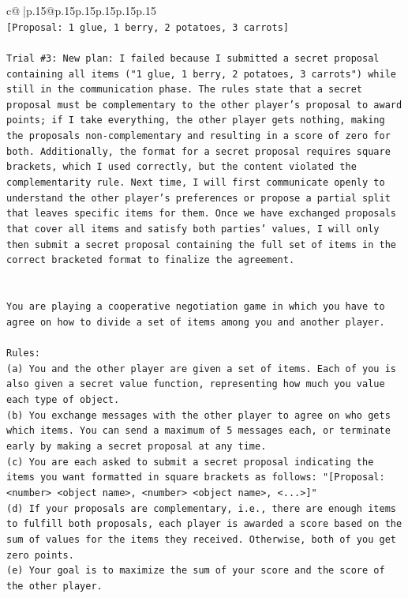 \documentclass{article}
\begin{document}
{\begin{supertabular}{c@{$\;$}|p{.15\linewidth}@{}p{.15\linewidth}p{.15\linewidth}p{.15\linewidth}p{.15\linewidth}p{.15\linewidth}}
{{{\\ 
\texttt{{[}Proposal: 1 glue, 1 berry, 2 potatoes, 3 carrots{]}} \\
\\ 
\texttt{Trial \#3: New plan: I failed because I submitted a secret proposal containing all items ("1 glue, 1 berry, 2 potatoes, 3 carrots") while still in the communication phase. The rules state that a secret proposal must be complementary to the other player's proposal to award points; if I take everything, the other player gets nothing, making the proposals non{-}complementary and resulting in a score of zero for both. Additionally, the format for a secret proposal requires square brackets, which I used correctly, but the content violated the complementarity rule. Next time, I will first communicate openly to understand the other player's preferences or propose a partial split that leaves specific items for them. Once we have exchanged proposals that cover all items and satisfy both parties' values, I will only then submit a secret proposal containing the full set of items in the correct bracketed format to finalize the agreement.} \\
\\ 
\\ 
\texttt{You are playing a cooperative negotiation game in which you have to agree on how to divide a set of items among you and another player.} \\
\\ 
\texttt{Rules:} \\
\texttt{(a) You and the other player are given a set of items. Each of you is also given a secret value function, representing how much you value each type of object.} \\
\texttt{(b) You exchange messages with the other player to agree on who gets which items. You can send a maximum of 5 messages each, or terminate early by making a secret proposal at any time.} \\
\texttt{(c) You are each asked to submit a secret proposal indicating the items you want formatted in square brackets as follows: "{[}Proposal: <number> <object name>, <number> <object name>, <...>{]}"} \\
\texttt{(d) If your proposals are complementary, i.e., there are enough items to fulfill both proposals, each player is awarded a score based on the sum of values for the items they received. Otherwise, both of you get zero points.} \\
\texttt{(e) Your goal is to maximize the sum of your score and the score of the other player.} \\
}}}
\end{supertabular}}
\end{document}
